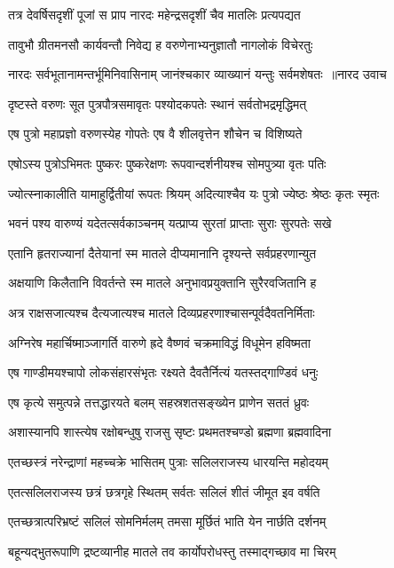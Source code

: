 \twolineshloka
{तत्र देवर्षिसदृशीं पूजां स प्राप नारदः}
{महेन्द्रसदृशीं चैव मातलिः प्रत्यपद्यत}


\twolineshloka
{तावुभौ ग्रीतमनसौ कार्यवन्तौ निवेद्य ह}
{वरुणेनाभ्यनुज्ञातौ नागलोकं विचेरतुः}


\threelineshloka
{नारदः सर्वभूतानामन्तर्भूमिनिवासिनाम्}
{जानंश्चकार व्याख्यानं यन्तुः सर्वमशेषतः ॥नारद उवाच}
{}


\twolineshloka
{दृष्टस्ते वरुणः सूत पुत्रपौत्रसमावृतः}
{पश्योदकपतेः स्थानं सर्वतोभद्रमृद्धिमत्}


\twolineshloka
{एष पुत्रो महाप्रज्ञो वरुणस्येह गोपतेः}
{एष वै शीलवृत्तेन शौचेन च विशिष्यते}


\twolineshloka
{एषोऽस्य पुत्रोऽभिमतः पुष्करः पुष्करेक्षणः}
{रूपवान्दर्शनीयश्च सोमपुत्र्या वृतः पतिः}


\twolineshloka
{ज्योत्स्नाकालीति यामाहुर्द्वितीयां रूपतः श्रियम्}
{अदित्याश्चैव यः पुत्रो ज्येष्ठः श्रेष्ठः कृतः स्मृतः}


\twolineshloka
{भवनं पश्य वारुण्यं यदेतत्सर्वकाञ्चनम्}
{यत्प्राप्य सुरतां प्राप्ताः सुराः सुरपतेः सखे}


\twolineshloka
{एतानि हृतराज्यानां दैतेयानां स्म मातले}
{दीप्यमानानि दृश्यन्ते सर्वप्रहरणान्युत}


\twolineshloka
{अक्षयाणि किलैतानि विवर्तन्ते स्म मातले}
{अनुभावप्रयुक्तानि सुरैरवजितानि ह}


\twolineshloka
{अत्र राक्षसजात्यश्च दैत्यजात्यश्च मातले}
{दिव्यप्रहरणाश्चासन्पूर्वदैवतनिर्मिताः}


\twolineshloka
{अग्निरेष महार्चिष्माञ्जागर्ति वारुणे ह्रदे}
{वैष्णवं चक्रमाविद्धं विधूमेन हविष्मता}


\twolineshloka
{एष गाण्डीमयश्चापो लोकसंहारसंभृतः}
{रक्ष्यते दैवतैर्नित्यं यतस्तद्गाण्डिवं धनुः}


\twolineshloka
{एष कृत्ये समुत्पन्ने तत्तद्धारयते बलम्}
{सहस्रशतसङ्ख्येन प्राणेन सततं ध्रुवः}


\twolineshloka
{अशास्यानपि शास्त्येष रक्षोबन्धुषु राजसु}
{सृष्टः प्रथमतश्चण्डो ब्रह्मणा ब्रह्मवादिना}


\twolineshloka
{एतच्छस्त्रं नरेन्द्राणां महच्चक्रे भासितम्}
{पुत्राः सलिलराजस्य धारयन्ति महोदयम्}


\twolineshloka
{एतत्सलिलराजस्य छत्रं छत्रगृहे स्थितम्}
{सर्वतः सलिलं शीतं जीमूत इव वर्षति}


\twolineshloka
{एतच्छत्रात्परिभ्रष्टं सलिलं सोमनिर्मलम्}
{तमसा मूर्छितं भाति येन नार्छति दर्शनम्}


\twolineshloka
{बहून्यद्भुतरूपाणि द्रष्टव्यानीह मातले}
{तव कार्योपरोधस्तु तस्माद्गच्छाव मा चिरम्}


